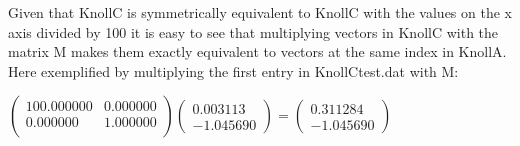 Given that KnollC is symmetrically equivalent to KnollC with the values on the x axis divided by 100 it is easy to see that multiplying vectors in KnollC with the matrix M makes them exactly equivalent to vectors at the same index in KnollA.
Here exemplified by multiplying the first entry in KnollCtest.dat with M:

$\begin{pmatrix}
 100.000000 & 0.000000 \\
 0.000000 & 1.000000 \\
\end{pmatrix}
 \begin{pmatrix}
 0.003113  \\
 -1.045690
\end{pmatrix}
= \begin{pmatrix}
 0.311284  \\ 
-1.045690
\end{pmatrix}
$